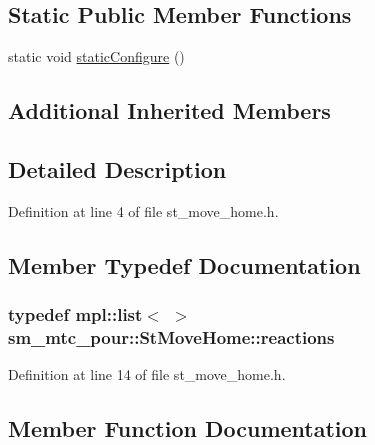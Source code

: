 \subsection*{Static Public Member Functions}
\begin{DoxyCompactItemize}
\item 
static void \hyperlink{structsm__mtc__pour_1_1StMoveHome_a41d9c46c1f0b7f2ee3de426b1325bcb7}{static\+Configure} ()
\end{DoxyCompactItemize}
\subsection*{Additional Inherited Members}


\subsection{Detailed Description}


Definition at line 4 of file st\+\_\+move\+\_\+home.\+h.



\subsection{Member Typedef Documentation}
\subsubsection[{\texorpdfstring{reactions}{reactions}}]{\setlength{\rightskip}{0pt plus 5cm}typedef mpl\+::list$<$ $>$ {\bf sm\+\_\+mtc\+\_\+pour\+::\+St\+Move\+Home\+::reactions}}\hypertarget{structsm__mtc__pour_1_1StMoveHome_ae6e8aae509386db027d9b5e9fcc6854d}{}\label{structsm__mtc__pour_1_1StMoveHome_ae6e8aae509386db027d9b5e9fcc6854d}


Definition at line 14 of file st\+\_\+move\+\_\+home.\+h.



\subsection{Member Function Documentation}
